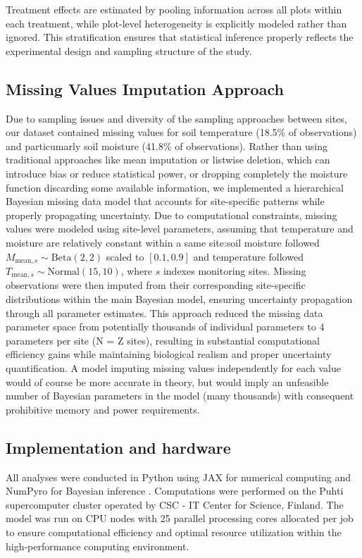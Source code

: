 \documentclass[12pt,a4paper]{article}
\begin{document}
Treatment effects are estimated by pooling information across all plots within each treatment, while plot-level heterogeneity is explicitly modeled rather than ignored. This stratification ensures that statistical inference properly reflects the experimental design and sampling structure of the study.


\subsection{Missing Values Imputation Approach}
Due to sampling issues and diversity of the sampling approaches between sites, our dataset contained missing values for soil temperature (18.5\% of observations) and particumarly soil moisture (41.8\% of observations). Rather than using traditional approaches like mean imputation or listwise deletion, which can introduce bias or reduce statistical power, or dropping completely the moisture function discarding some available information, we implemented a hierarchical Bayesian missing data model that accounts for site-specific patterns while properly propagating uncertainty.
Due to computational constraints, missing values were modeled using site-level parameters, assuming that temperature and moisture are relatively constant within a same site:soil moisture followed $M_{\text{mean},s} \sim \text{Beta}(2,2)$ scaled to $[0.1, 0.9]$ and temperature followed $T_{\text{mean},s} \sim \text{Normal}(15, 10)$, where $s$ indexes monitoring sites.
Missing observations were then imputed from their corresponding site-specific distributions within the main Bayesian model, ensuring uncertainty propagation through all parameter estimates. This approach reduced the missing data parameter space from potentially thousands of individual parameters to 4 parameters per site (N = Z sites), resulting in substantial computational efficiency gains while maintaining biological realism and proper uncertainty quantification. A model imputing missing values independently for each value would of course be more accurate in theory, but would imply an unfeasible number of Bayesian parameters in the model (many thousands) with consequent prohibitive memory and power requirements.



\subsection{Implementation and hardware}\label{sec:implementation}

All analyses were conducted in Python using JAX for numerical computing and NumPyro for Bayesian inference \citep{phan2019composable}. Computations were performed on the Puhti supercomputer cluster operated by CSC - IT Center for Science, Finland. The model was run on CPU nodes with 25 parallel processing cores allocated per job to ensure computational efficiency and optimal resource utilization within the high-performance computing environment.
\end{document}
